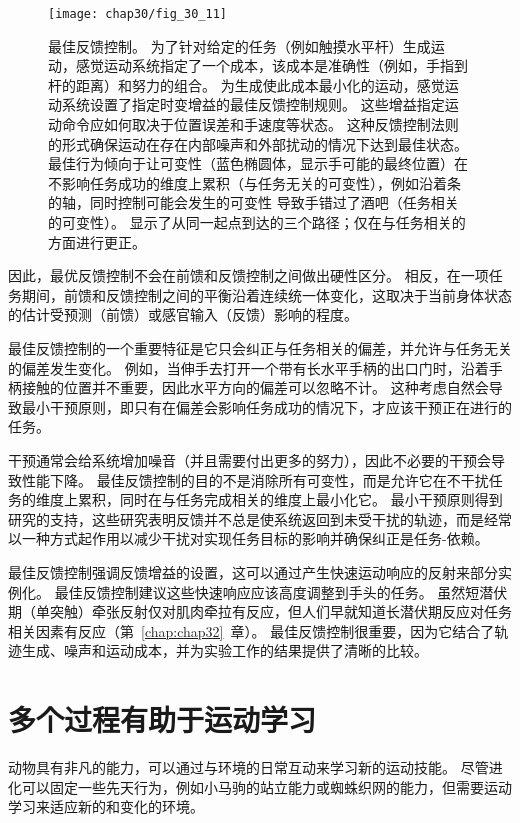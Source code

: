 \begin{figure}[htbp]
	\centering
	\texttt{[image: chap30/fig\_30\_11]}
	\caption{最佳反馈控制。
		为了针对给定的任务（例如触摸水平杆）生成运动，感觉运动系统指定了一个成本，该成本是准确性（例如，手指到杆的距离）和努力的组合。
		为生成使此成本最小化的运动，感觉运动系统设置了指定时变增益的最佳反馈控制规则。
		这些增益指定运动命令应如何取决于位置误差和手速度等状态。
		这种反馈控制法则的形式确保运动在存在内部噪声和外部扰动的情况下达到最佳状态。
		最佳行为倾向于让可变性（蓝色椭圆体，显示手可能的最终位置）在不影响任务成功的维度上累积（与任务无关的可变性），例如沿着条的轴，同时控制可能会发生的可变性 导致手错过了酒吧（任务相关的可变性）。
		显示了从同一起点到达的三个路径；仅在与任务相关的方面进行更正。}
	\label{fig:30_11}
\end{figure}


因此，最优反馈控制不会在前馈和反馈控制之间做出硬性区分。
相反，在一项任务期间，前馈和反馈控制之间的平衡沿着连续统一体变化，这取决于当前身体状态的估计受预测（前馈）或感官输入（反馈）影响的程度。


最佳反馈控制的一个重要特征是它只会纠正与任务相关的偏差，并允许与任务无关的偏差发生变化。
例如，当伸手去打开一个带有长水平手柄的出口门时，沿着手柄接触的位置并不重要，因此水平方向的偏差可以忽略不计。
这种考虑自然会导致最小干预原则，即只有在偏差会影响任务成功的情况下，才应该干预正在进行的任务。


干预通常会给系统增加噪音（并且需要付出更多的努力），因此不必要的干预会导致性能下降。
最佳反馈控制的目的不是消除所有可变性，而是允许它在不干扰任务的维度上累积，同时在与任务完成相关的维度上最小化它。
最小干预原则得到研究的支持，这些研究表明反馈并不总是使系统返回到未受干扰的轨迹，而是经常以一种方式起作用以减少干扰对实现任务目标的影响并确保纠正是任务-依赖。


最佳反馈控制强调反馈增益的设置，这可以通过产生快速运动响应的反射来部分实例化。
最佳反馈控制建议这些快速响应应该高度调整到手头的任务。
虽然短潜伏期（单突触）牵张反射仅对肌肉牵拉有反应，但人们早就知道长潜伏期反应对任务相关因素有反应（第~\ref{chap:chap32}~章）。
最佳反馈控制很重要，因为它结合了轨迹生成、噪声和运动成本，并为实验工作的结果提供了清晰的比较。



\section{多个过程有助于运动学习}

动物具有非凡的能力，可以通过与环境的日常互动来学习新的运动技能。
尽管进化可以固定一些先天行为，例如小马驹的站立能力或蜘蛛织网的能力，但需要运动学习来适应新的和变化的环境。


